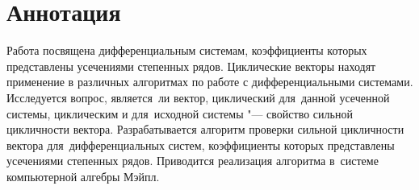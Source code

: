 \section*{Аннотация}

Работа посвящена дифференциальным системам, коэффициенты которых представлены усечениями степенных рядов.
Циклические векторы находят применение в различных алгоритмах по работе с дифференциальными системами.
Исследуется вопрос, является~ли вектор, циклический для~данной усеченной системы,
циклическим и для~исходной системы "--- свойство сильной цикличности вектора.
Разрабатывается алгоритм проверки сильной цикличности вектора для~дифференциальных систем,
коэффициенты которых представлены усечениями степенных рядов.
Приводится реализация алгоритма в~системе компьютерной алгебры Мэйпл.